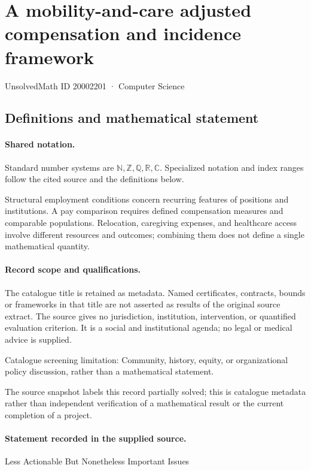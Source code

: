 \documentclass[11pt]{article}
\begin{document}
\setcounter{section}{20002200}
\section{A mobility-and-care adjusted compensation and incidence framework}\label{20002201}
{\small\sffamily UnsolvedMath ID 20002201 · Computer Science}
\subsection{Definitions and mathematical statement}

\paragraph{Shared notation.}Standard number systems are $\mathbb N,\mathbb Z,\mathbb Q,\mathbb R,\mathbb C$. Specialized notation and index ranges follow the cited source and the definitions below.


Structural employment conditions concern recurring features of positions and institutions. A pay comparison requires defined compensation measures and comparable populations. Relocation, caregiving expenses, and healthcare access involve different resources and outcomes; combining them does not define a single mathematical quantity.
\paragraph{Record scope and qualifications.}
The catalogue title is retained as metadata. Named certificates, contracts, bounds or frameworks in that title are not asserted as results of the original source extract.
The source gives no jurisdiction, institution, intervention, or quantified evaluation criterion. It is a social and institutional agenda; no legal or medical advice is supplied.

Catalogue screening limitation: Community, history, equity, or organizational policy discussion, rather than a mathematical statement.

The source snapshot labels this record partially solved; this is catalogue metadata rather than independent verification of a mathematical result or the current completion of a project.
\paragraph{Statement recorded in the supplied source.}
Less Actionable But Nonetheless Important Issues
\end{document}
